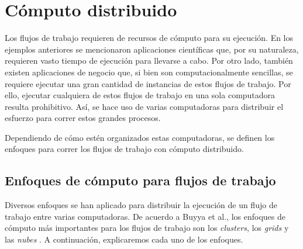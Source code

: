 \documentclass[letterpaper, 12pt]{report}
\begin{document}










\chapter{Cómputo distribuido}
Los flujos de trabajo requieren de recursos de cómputo para su ejecución. En los ejemplos anteriores se mencionaron aplicaciones científicas que, por su naturaleza, requieren vasto tiempo de ejecución para llevarse a cabo. Por otro lado, también existen aplicaciones de negocio que, si bien son computacionalmente sencillas, se requiere ejecutar una gran cantidad de instancias de estos flujos de trabajo. Por ello, ejecutar cualquiera de estos flujos de trabajo en una sola computadora resulta prohibitivo. Así, se hace uso de varias computadoras para distribuir el esfuerzo para correr estos grandes procesos.

Dependiendo de cómo estén organizados estas computadoras, se definen los enfoques para correr los flujos de trabajo con cómputo distribuido.

\section{Enfoques de cómputo para flujos de trabajo}
Diversos enfoques se han aplicado para distribuir la ejecución de un flujo de trabajo entre varias computadoras.  De acuerdo a Buyya et al., los enfoques de cómputo más importantes para los flujos de trabajo son los \emph{clusters}, los \emph{grids} y las \emph{nubes} \cite{buyya2009cloud}. A continuación, explicaremos cada uno de los enfoques.
\end{document}

